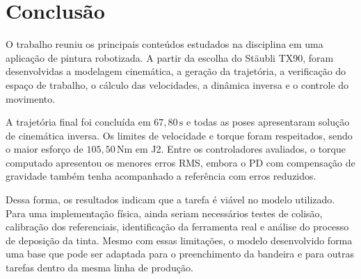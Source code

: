 \newpage
\section{Conclusão}

O trabalho reuniu os principais conteúdos estudados na disciplina em uma aplicação de pintura robotizada. A partir da escolha do Stäubli TX90, foram desenvolvidas a modelagem cinemática, a geração da trajetória, a verificação do espaço de trabalho, o cálculo das velocidades, a dinâmica inversa e o controle do movimento.

A trajetória final foi concluída em $67{,}80\,\text{s}$ e todas as poses apresentaram solução de cinemática inversa. Os limites de velocidade e torque foram respeitados, sendo o maior esforço de $105{,}50\,\text{Nm}$ em J2. Entre os controladores avaliados, o torque computado apresentou os menores erros RMS, embora o PD com compensação de gravidade também tenha acompanhado a referência com erros reduzidos.

Dessa forma, os resultados indicam que a tarefa é viável no modelo utilizado. Para uma implementação física, ainda seriam necessários testes de colisão, calibração dos referenciais, identificação da ferramenta real e análise do processo de deposição da tinta. Mesmo com essas limitações, o modelo desenvolvido forma uma base que pode ser adaptada para o preenchimento da bandeira e para outras tarefas dentro da mesma linha de produção.
